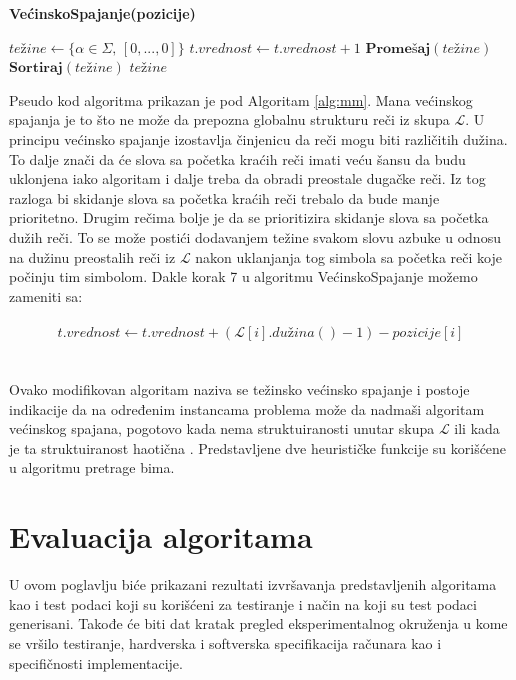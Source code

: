 \documentclass[12pt,oneside]{memoir}
\begin{document}
\begin{algorithm}
  \caption{\textbf{VećinskoSpajanje(pozicije)}}
  \label{alg:mm}
  \begin{algorithmic}[1]
  \State $te\textrm{ž}ine \gets \{\alpha \in \Sigma\textrm{, }[0,...,0] \}$ 
  \State
          \State $t.vrednost \gets t.vrednost + 1$
        \EndIf 
      \EndFor
    \EndIf 
  \EndFor
  \State
  \State $\textbf{Promešaj}(te\textrm{ž}ine)$
  \State $\textbf{Sortiraj}(te\textrm{ž}ine)$
  \State
  \State \Return $te\textrm{ž}ine$
  \end{algorithmic}
  \end{algorithm}

Pseudo kod algoritma prikazan je pod Algoritam \ref{alg:mm}.
Mana većinskog spajanja je to što ne može da prepozna globalnu strukturu reči iz skupa $\mathcal{L}$.
U principu većinsko spajanje izostavlja činjenicu da reči mogu biti različitih dužina. To dalje 
znači da će slova sa početka kraćih reči imati veću šansu da budu uklonjena iako algoritam i dalje treba
da obradi preostale dugačke reči. Iz tog razloga bi skidanje slova sa početka kraćih reči trebalo da bude
manje prioritetno. Drugim rečima bolje je da se prioritizira skidanje slova sa početka dužih reči.
To se može postići dodavanjem težine svakom slovu azbuke u odnosu na dužinu preostalih reči iz $\mathcal{L}$ 
nakon uklanjanja tog simbola sa početka reči koje počinju tim simbolom. Dakle korak 7 u algoritmu VećinskoSpajanje
možemo zameniti sa:
\\
\\
\begin{equation}
  \label{eqn:wmm}
  t.vrednost \gets t.vrednost + (\mathcal{L}[i].du\textrm{ž}ina() - 1) - pozicije[i]
\end{equation}
\\
\\
Ovako modifikovan algoritam naziva se težinsko većinsko spajanje i postoje indikacije da na određenim instancama
problema može da nadmaši algoritam većinskog spajana, pogotovo kada nema struktuiranosti unutar skupa $\mathcal{L}$
ili kada je ta struktuiranost haotična \cite{ProbabilisticBS}. Predstavljene dve heurističke
funkcije su korišćene u algoritmu pretrage bima.

\chapter{Evaluacija algoritama}
\label{chap:evaluacijaAlg}
U ovom poglavlju biće prikazani rezultati izvršavanja predstavljenih algoritama
kao i test podaci koji su korišćeni za testiranje i način na koji su test podaci generisani.
Takođe će biti dat kratak pregled eksperimentalnog okruženja u kome se vršilo testiranje,
hardverska i softverska specifikacija računara kao i specifičnosti implementacije.
\end{document}
